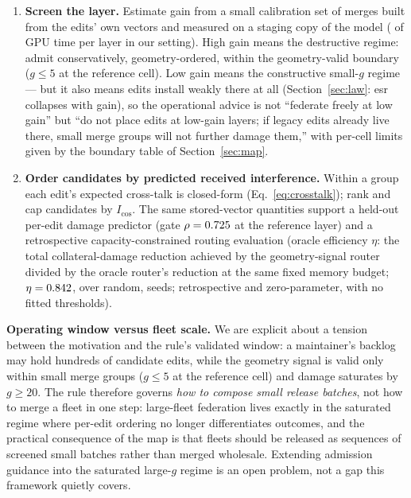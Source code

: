 \documentclass[preprint,12pt]{elsarticle}
\theoremstyle{definition}
\begin{document}
\begin{enumerate}
\item \textbf{Screen the layer.} Estimate gain from a small calibration set of merges
built from the edits' own vectors and measured on a staging copy of the model
(\calibTime{} of GPU time per layer in our setting). High gain means the destructive regime: admit conservatively, geometry-ordered,
within the geometry-valid boundary ($g\leq5$ at the reference cell). Low gain means the
constructive small-$g$ regime --- but it also means edits install weakly there at all
(Section~\ref{sec:law}: esr collapses with gain), so the operational advice is not
``federate freely at low gain'' but ``do not place edits at low-gain layers; if
legacy edits already live there, small merge groups will not further damage them,''
with per-cell limits given by the boundary table of Section~\ref{sec:map}.
\item \textbf{Order candidates by predicted received interference.} Within a group each
edit's expected cross-talk is closed-form (Eq.~\ref{eq:crosstalk}); rank and cap candidates
by $I_{\cos}$. The same stored-vector quantities support a held-out per-edit damage
predictor (gate $\rho=0.725{}$ at the reference layer) and a retrospective
capacity-constrained routing evaluation (oracle efficiency $\eta$: the total
collateral-damage reduction achieved by the geometry-signal router divided by the
oracle router's reduction at the same fixed memory budget; $\eta=0.842{}$,
\routingMargin{} over random, \routingSeeds{} seeds; retrospective and zero-parameter, with
no fitted thresholds).
\end{enumerate}

\textbf{Operating window versus fleet scale.} We are explicit about a tension between
the motivation and the rule's validated window: a maintainer's backlog may hold
hundreds of candidate edits, while the geometry signal is valid only within small
merge groups ($g\leq5$ at the reference cell) and damage saturates by $g\geq20$. The
rule therefore governs \emph{how to compose small release batches}, not how to merge
a fleet in one step: large-fleet federation lives exactly in the saturated regime
where per-edit ordering no longer differentiates outcomes, and the practical
consequence of the map is that fleets should be released as sequences of screened
small batches rather than merged wholesale. Extending admission guidance into the
saturated large-$g$ regime is an open problem, not a gap this framework quietly covers.
\end{document}
